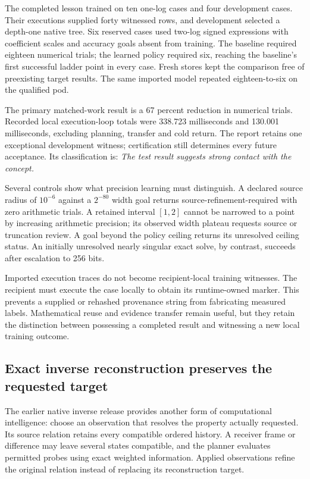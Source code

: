 The completed lesson trained on ten one-log cases and four development cases. Their executions supplied forty witnessed rows, and development selected a depth-one native tree. Six reserved cases used two-log signed expressions with coefficient scales and accuracy goals absent from training. The baseline required eighteen numerical trials; the learned policy required six, reaching the baseline's first successful ladder point in every case. Fresh stores kept the comparison free of preexisting target results. The same imported model repeated eighteen-to-six on the qualified pod.

The primary matched-work result is a 67 percent reduction in numerical trials. Recorded local execution-loop totals were 338.723 milliseconds and 130.001 milliseconds, excluding planning, transfer and cold return. The report retains one exceptional development witness; certification still determines every future acceptance. Its classification is: \emph{The test result suggests strong contact with the concept.}

Several controls show what precision learning must distinguish. A declared source radius of $10^{-6}$ against a $2^{-80}$ width goal returns source-refinement-required with zero arithmetic trials. A retained interval $[1,2]$ cannot be narrowed to a point by increasing arithmetic precision; its observed width plateau requests source or truncation review. A goal beyond the policy ceiling returns its unresolved ceiling status. An initially unresolved nearly singular exact solve, by contrast, succeeds after escalation to 256 bits.

Imported execution traces do not become recipient-local training witnesses. The recipient must execute the case locally to obtain its runtime-owned marker. This prevents a supplied or rehashed provenance string from fabricating measured labels. Mathematical reuse and evidence transfer remain useful, but they retain the distinction between possessing a completed result and witnessing a new local training outcome.

\subsection{Exact inverse reconstruction preserves the requested target}
\label{v3-runtime-inverse}

The earlier native inverse release provides another form of computational intelligence: choose an observation that resolves the property actually requested. Its source relation retains every compatible ordered history. A receiver frame or difference may leave several states compatible, and the planner evaluates permitted probes using exact weighted information. Applied observations refine the original relation instead of replacing its reconstruction target.

